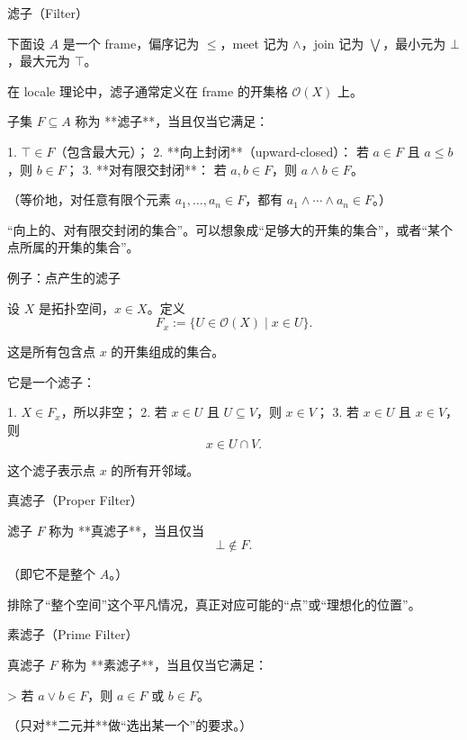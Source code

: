 \documentclass{beamer}
\begin{document}
\begin{frame}[fragile]{滤子（Filter）}
\begin{markdown}
下面设 $A$ 是一个 frame，偏序记为 $\le$，meet 记为 $\wedge$，join 记为 $\bigvee$，最小元为 $\bot$，最大元为 $\top$。

在 locale 理论中，滤子通常定义在 frame 的开集格 $\mathcal O(X)$ 上。

子集 $F\subseteq A$ 称为 **滤子**，当且仅当它满足：

1. $\top\in F$（包含最大元）；
2. **向上封闭**（upward-closed）：  
   若 $a\in F$ 且 $a\leq b$，则 $b\in F$；
3. **对有限交封闭**：  
   若 $a,b\in F$，则 $a\wedge b\in F$。

（等价地，对任意有限个元素 $a_1,\dots,a_n\in F$，都有 $a_1\wedge\cdots\wedge a_n\in F$。）
\end{markdown}
\end{frame}

\begin{frame}[fragile]
\begin{markdown}
“向上的、对有限交封闭的集合”。可以想象成“足够大的开集的集合”，或者“某个点所属的开集的集合”。

\vspace{4ex}
例子：点产生的滤子

设 $X$ 是拓扑空间，$x\in X$。定义
$$
F_x
:=
\{U\in\mathcal O(X)\mid x\in U\}.
$$

这是所有包含点 $x$ 的开集组成的集合。

它是一个滤子：

1. $X\in F_x$，所以非空；
2. 若 $x\in U$ 且 $U\subseteq V$，则 $x\in V$；
3. 若 $x\in U$ 且 $x\in V$，则
   $$x\in U\cap V.$$

这个滤子表示点 $x$ 的所有开邻域。
\end{markdown}
\end{frame}

\begin{frame}[fragile]{真滤子（Proper Filter）}
\begin{markdown}
滤子 $F$ 称为 **真滤子**，当且仅当  
$$
\bot\notin F.
$$

（即它不是整个 $A$。）

\vspace{4ex}
排除了“整个空间”这个平凡情况，真正对应可能的“点”或“理想化的位置”。
\end{markdown}
\end{frame}

\begin{frame}[fragile]{素滤子（Prime Filter）}
\begin{markdown}
真滤子 $F$ 称为 **素滤子**，当且仅当它满足：

> 若 $a\vee b\in F$，则 $a\in F$ 或 $b\in F$。

（只对**二元并**做“选出某一个”的要求。）
\end{markdown}
\end{frame}
\end{document}
